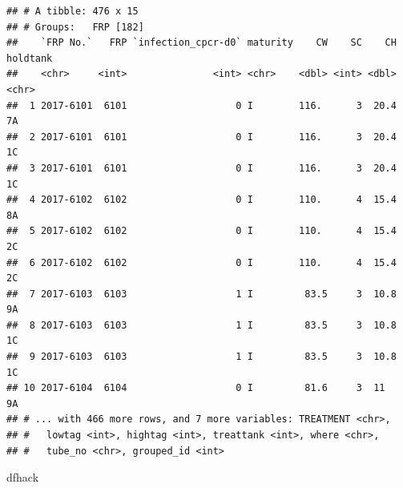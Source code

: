 \documentclass[]{article}
\newenvironment{Shaded}{\begin{snugshade}}{\end{snugshade}}
\newcommand{\KeywordTok}[1]{\textcolor[rgb]{0.13,0.29,0.53}{\textbf{#1}}}
\newcommand{\DataTypeTok}[1]{\textcolor[rgb]{0.13,0.29,0.53}{#1}}
\newcommand{\StringTok}[1]{\textcolor[rgb]{0.31,0.60,0.02}{#1}}
\newcommand{\OperatorTok}[1]{\textcolor[rgb]{0.81,0.36,0.00}{\textbf{#1}}}
\newcommand{\NormalTok}[1]{#1}
\begin{document}
\begin{Shaded}
\end{Shaded}

\begin{verbatim}
## # A tibble: 476 x 15
## # Groups:   FRP [182]
##    `FRP No.`   FRP `infection_cpcr-d0` maturity    CW    SC    CH holdtank
##    <chr>     <int>               <int> <chr>    <dbl> <int> <dbl> <chr>   
##  1 2017-6101  6101                   0 I        116.      3  20.4 7A      
##  2 2017-6101  6101                   0 I        116.      3  20.4 1C      
##  3 2017-6101  6101                   0 I        116.      3  20.4 1C      
##  4 2017-6102  6102                   0 I        110.      4  15.4 8A      
##  5 2017-6102  6102                   0 I        110.      4  15.4 2C      
##  6 2017-6102  6102                   0 I        110.      4  15.4 2C      
##  7 2017-6103  6103                   1 I         83.5     3  10.8 9A      
##  8 2017-6103  6103                   1 I         83.5     3  10.8 1C      
##  9 2017-6103  6103                   1 I         83.5     3  10.8 1C      
## 10 2017-6104  6104                   0 I         81.6     3  11   9A      
## # ... with 466 more rows, and 7 more variables: TREATMENT <chr>,
## #   lowtag <int>, hightag <int>, treattank <int>, where <chr>,
## #   tube_no <chr>, grouped_id <int>
\end{verbatim}

\begin{Shaded}
\end{Shaded}

\begin{Shaded}
\begin{Highlighting}[]
\NormalTok{dfhack}
\end{Highlighting}
\end{Shaded}
\end{document}
